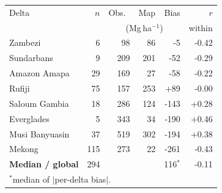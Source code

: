 \begin{tabular}{lrrrrr}
\toprule
Delta & $n$ & Obs.\ & Map & Bias & $r$ \\
 & & \multicolumn{3}{c}{(Mg\,ha$^{-1}$)} & within \\
\midrule
Zambezi & 6 & 98 & 86 & -5 & -0.42 \\
Sundarbans & 9 & 209 & 201 & -52 & -0.29 \\
Amazon Amapa & 29 & 169 & 27 & -58 & -0.22 \\
Rufiji & 75 & 157 & 253 & +89 & -0.00 \\
Saloum Gambia & 18 & 286 & 124 & -143 & +0.28 \\
Everglades & 5 & 343 & 34 & -190 & +0.46 \\
Musi Banyuasin & 37 & 519 & 302 & -194 & +0.38 \\
Mekong & 115 & 273 & 22 & -261 & -0.43 \\
\midrule
\textbf{Median / global} & 294 & & & 116$^{*}$ & -0.11 \\
\bottomrule
\multicolumn{6}{l}{\footnotesize $^{*}$median of $|$per-delta bias$|$.}\\
\end{tabular}
